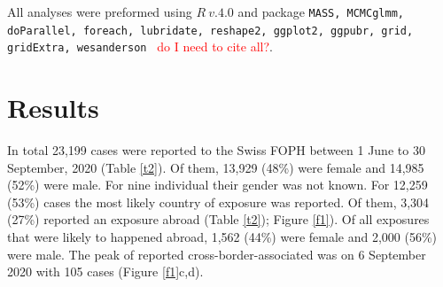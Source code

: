 \documentclass[10pt, a4paper, twoside]{article}
\begin{document}
\begin{multicols}{2}
All analyses were preformed using $R ~v.4.0$ and package \texttt{MASS, MCMCglmm, doParallel, foreach, lubridate, reshape2, ggplot2, ggpubr, grid, gridExtra, wesanderson } \textcolor{red}{do I need to cite all?}.\cite{r_core_team_r_2020,venables_modern_2002}

\section{Results}
In total 23,199 cases were reported to the Swiss FOPH between 1 June to 30 September, 2020 (Table \ref{t2}). 
Of them, 13,929 (48\%) were female and 14,985 (52\%) were male.
For nine individual their gender was not known.
For 12,259 (53\%) cases the most likely country of exposure was reported.
Of them, 3,304 (27\%) reported an exposure abroad (Table \ref{t2}); Figure \ref{f1}).
Of all exposures that were likely to happened abroad, 1,562 (44\%) were female and 2,000 (56\%) were male.
The peak of reported cross-border-associated was on 6 September 2020 with 105 cases (Figure \ref{f1}c,d).

\end{multicols}
\begin{landscape}
\global\pdfpageattr\expandafter{\the\pdfpageattr/Rotate 90}
}
\end{landscape}
\end{document}
